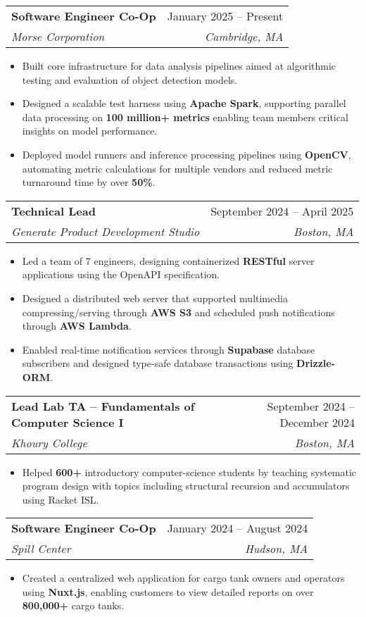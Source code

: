 \documentclass[letterpaper,11pt]{article}
\makeatletter
\newcommand{\resumeItem}[1]{
  \item\small{
    {#1 \vspace{-2pt}}
  }
}
\newcommand{\resumeSubheading}[4]{
  \vspace{-2pt}\item
    \begin{tabular*}{0.97\textwidth}[t]{l@{\extracolsep{\fill}}r}
      \textbf{#1} & #2 \\
      \textit{\small#3} & \textit{\small #4} \\
    \end{tabular*}\vspace{-7pt}
}
\newcommand{\resumeSubSubheading}[2]{
    \item
    \begin{tabular*}{0.97\textwidth}{l@{\extracolsep{\fill}}r}
      \textit{\small#1} & \textit{\small #2} \\
    \end{tabular*}\vspace{-7pt}
}
\newcommand{\resumeSubHeadingListEnd}{\end{itemize}}
\newcommand{\resumeItemListStart}{\begin{itemize}}
\newcommand{\resumeItemListEnd}{\end{itemize}\vspace{-5pt}}
\makeatother
\begin{document}
\resumeSubheading
{Software Engineer Co-Op}{January 2025 -- Present}
{Morse Corporation}{Cambridge, MA}
\resumeItemListStart
\resumeItem { Built core infrastructure for data analysis pipelines aimed at algorithmic testing and evaluation of object detection models. }
\resumeItem { Designed a scalable test harness using \textbf{Apache Spark}, supporting parallel data processing on \textbf{100 million+ metrics} enabling team members critical insights on model performance.}
\resumeItem { Deployed model runners and inference processing pipelines using \textbf{OpenCV}, automating metric calculations for multiple vendors and reduced metric turnaround time by over \textbf{50\%}. }
\resumeItemListEnd


\resumeSubheading
{Technical Lead}{September 2024 -- April 2025}
{Generate Product Development Studio}{Boston, MA}
\resumeItemListStart
\resumeItem { Led a team of 7 engineers, designing containerized \textbf{RESTful} server applications using the OpenAPI specification.}
\resumeItem{
	Designed a distributed web server that supported multimedia compressing/serving through \textbf{AWS S3} and scheduled push notifications through \textbf{AWS Lambda}.
}
\resumeItem { Enabled real-time notification services through \textbf{Supabase} database subscribers and designed type-safe database transactions using \textbf{Drizzle-ORM}.}
\resumeItemListEnd

\resumeSubheading
{Lead Lab TA -- Fundamentals of Computer Science I}{September 2024 -- December 2024}
{Khoury College}{Boston, MA}
\resumeItemListStart
\resumeItem { Helped \textbf{600+} introductory computer-science students by teaching systematic program design with topics including structural recursion and accumulators using Racket ISL. }
\resumeItemListEnd

\resumeSubheading
{Software Engineer Co-Op}{January 2024 -- August 2024}
{Spill Center}{Hudson, MA}
\resumeItemListStart
\resumeItem { Created a centralized web application for cargo tank owners and operators using \textbf{Nuxt.js}, enabling customers to view detailed reports on over \textbf{800,000+} cargo tanks. }
\resumeItemListEnd
\end{document}
